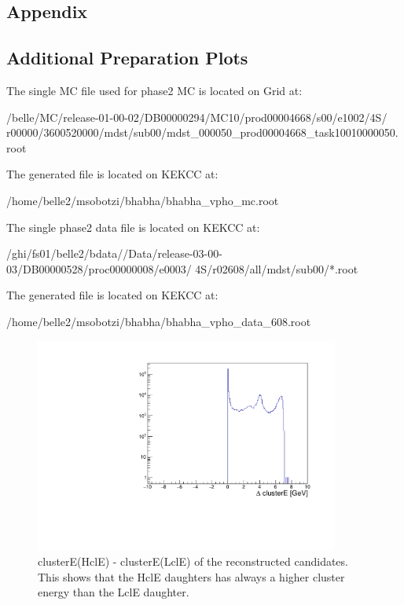 \documentclass[a4paper,11pt,twosided,final,german,openbib,pdftex,listof=totoc,bibliography=totoc]{scrbook}
\begin{document}
\begin{appendix}
	

\chapter{Appendix}
	
	
\section{Additional Preparation Plots}


The single MC file used for phase2 MC is located on Grid at:
\newline 

/belle/MC/release-01-00-02/DB00000294/MC10/prod00004668/s00/e1002/4S/
r00000/3600520000/mdst/sub00/mdst\_000050\_prod00004668\_task10010000050.root
\newline

The generated file is located on KEKCC at:
\newline

/home/belle2/msobotzi/bhabha/bhabha\_vpho\_mc.root
\newline

The single phase2 data file is located on KEKCC at:
\newline

/ghi/fs01/belle2/bdata//Data/release-03-00-03/DB00000528/proc00000008/e0003/
4S/r02608/all/mdst/sub00/*.root
\newline

The generated file is located on KEKCC at:
\newline

/home/belle2/msobotzi/bhabha/bhabha\_vpho\_data\_608.root
\newline


\begin{figure}[h!]
	\centering
	\includegraphics[width=10cm]{AnhangPlots/clEDiff.pdf}
	\caption[clusterE(HclE) - clusterE(LclE)]{clusterE(HclE) - clusterE(LclE) of the reconstructed candidates. This shows that the HclE daughters has always a higher cluster energy than the LclE daughter.}
	\label{fig:clEDiff}
\end{figure}








\end{appendix}
\end{document}
